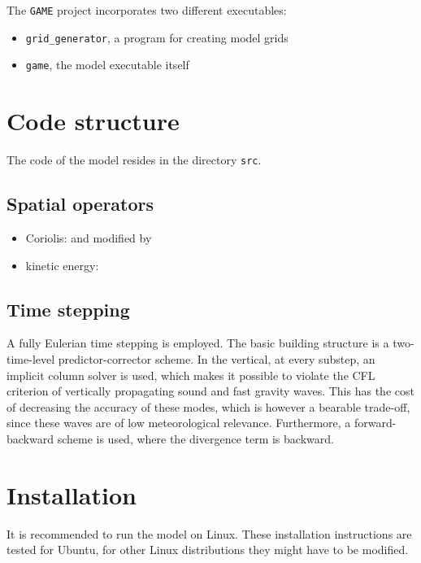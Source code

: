 \documentclass[10pt]{report}
\begin{document}
The \texttt{GAME} project incorporates two different executables:

\begin{itemize}
\item \texttt{grid\_generator}, a program for creating model grids
\item \texttt{game}, the model executable itself
\end{itemize}

\chapter{Code structure}
\label{chap:code_structure}

The code of the model resides in the directory \texttt{src}.

\section{Spatial operators}
\label{sec:spatial_operators}

\begin{itemize}
\item Coriolis: \cite{thuburn_f_discrete_plane} and \cite{ringler_trsk} modified by \cite{doi:10.1002/qj.3294}
\item kinetic energy: \cite{doi:10.1002/qj.1960}
\end{itemize}

\section{Time stepping}
\label{sec:time_stepping}

A fully Eulerian time stepping is employed. The basic building structure is a two-time-level predictor-corrector scheme. In the vertical, at every substep, an implicit column solver is used, which makes it possible to violate the CFL criterion of vertically propagating sound and fast gravity waves. This has the cost of decreasing the accuracy of these modes, which is however a bearable trade-off, since these waves are of low meteorological relevance. Furthermore, a forward-backward scheme is used, where the divergence term is backward.

\chapter{Installation}
\label{chap:installation}

It is recommended to run the model on Linux. These installation instructions are tested for Ubuntu, for other Linux distributions they might have to be modified.
\end{document}
